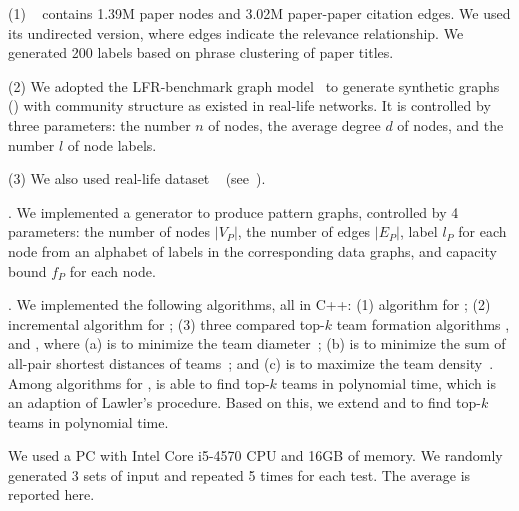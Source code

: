 \ni (1) {\em \citationd}~\cite{citationWeb} contains 1.39M paper nodes and 3.02M paper-paper citation edges.
We used its undirected version, where edges indicate the relevance relationship. We generated 200 labels based on phrase clustering of paper titles.


\ni (2) We adopted the LFR-benchmark graph model~\cite{AndreaSF08} to generate synthetic graphs (\synthetic) with community structure as existed in real-life networks. It is controlled by three parameters: the number $n$ of nodes, the average degree $d$ of nodes, and the number $l$ of node labels.

\ni (3) We also used real-life dataset \youtube~\cite{youtubeWeb} (see~\cite{fullvldb18}). 

.
We implemented a generator to produce pattern graphs, controlled by 4 parameters:
the number of nodes $|V_P|$, the number of edges $|E_P|$, label $l_{P}$ for each node from
an alphabet of labels in the corresponding data graphs,
and capacity bound $f_{P}$ for each node.

. We implemented the following algorithms, all in C++:
(1) algorithm \optgrouprec for \teamF; (2) incremental algorithm \inc for \dynteamF;
(3) three compared top-$k$ team formation algorithms \mindia, \minsumdis and \denalk, where
(a) \mindia is to minimize the team diameter~\cite{Lappas09}; 
(b) \minsumdis is to minimize the sum of all-pair shortest distances of teams~\cite{Kargar11}; and
(c) \denalk is to maximize the team density~\cite{GajewarS12}. 
Among algorithms for \teamF, \minsumdis is able to find top-$k$ teams in polynomial time, which is an adaption of Lawler's procedure.
Based on this, we extend \mindia and \denalk to find top-$k$ teams in polynomial time.

We used a PC with Intel Core i5-4570 CPU and 16GB of memory. We randomly generated 3 sets of input and repeated 5 times for each test. The average is reported here.

